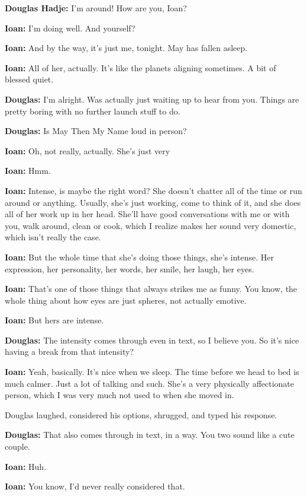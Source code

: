 \textbf{Douglas Hadje:} I'm around! How are you, Ioan?

\textbf{Ioan:} I'm doing well. And yourself?

\textbf{Ioan:} And by the way, it's just me, tonight. May has fallen asleep.

\textbf{Ioan:} All of her, actually. It's like the planets aligning sometimes. A bit of blessed quiet.

\textbf{Douglas:} I'm alright. Was actually just waiting up to hear from you. Things are pretty boring with no further launch stuff to do.

\textbf{Douglas:} Is May Then My Name loud in person?

\textbf{Ioan:} Oh, not really, actually. She's just very

\textbf{Ioan:} Hmm.

\textbf{Ioan:} Intense, is maybe the right word? She doesn't chatter all of the time or run around or anything. Usually, she's just working, come to think of it, and she does all of her work up in her head. She'll have good conversations with me or with you, walk around, clean or cook, which I realize makes her sound very domestic, which isn't really the case.

\textbf{Ioan:} But the whole time that she's doing those things, she's intense. Her expression, her personality, her words, her smile, her laugh, her eyes.

\textbf{Ioan:} That's one of those things that always strikes me as funny. You know, the whole thing about how eyes are just spheres, not actually emotive.

\textbf{Ioan:} But hers are intense.

\textbf{Douglas:} The intensity comes through even in text, so I believe you. So it's nice having a break from that intensity?

\textbf{Ioan:} Yeah, basically. It's nice when we sleep. The time before we head to bed is much calmer. Just a lot of talking and such. She's a very physically affectionate person, which I was very much not used to when she moved in.

Douglas laughed, considered his options, shrugged, and typed his response.

\textbf{Douglas:} That also comes through in text, in a way. You two sound like a cute couple.

\textbf{Ioan:} Huh.

\textbf{Ioan:} You know, I'd never really considered that.

